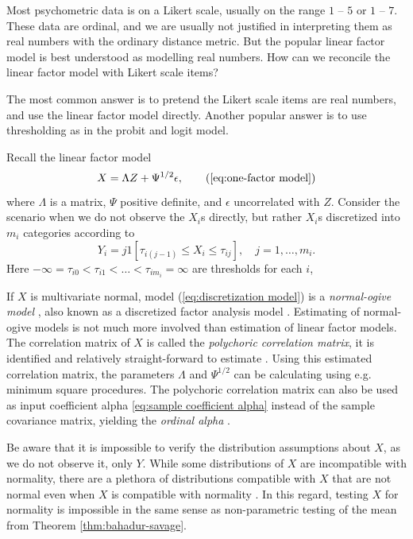 Most psychometric data is on a Likert scale, usually on the range $1$ -- $5$ or $1$ -- $7$. These data are ordinal, and we are usually not justified in interpreting them as real numbers with the ordinary distance metric. But the popular linear factor model is best understood as modelling real numbers. How can we reconcile the linear factor model with Likert scale items?

The most common answer is to pretend the Likert scale items are real numbers, and use the linear factor model directly. Another popular answer is to use thresholding as in the probit and logit model.  

Recall the linear factor model
\begin{equation}
X=\Lambda Z+\Psi^{1/2}\epsilon,      \tag{\ref{eq:one-factor model}}
\end{equation}
where $\Lambda$ is a matrix, $\Psi$ positive definite, and $\epsilon$ uncorrelated with $Z$. Consider the scenario when we do not observe the $X_{i}$s directly, but rather $X_{i}$s discretized into $m_{i}$ categories according to
\begin{equation}
Y_{i}=j1[\tau_{i(j-1)}\leq X_{i}\leq\tau_{ij}],\quad j = 1, \ldots,m_i. \label{eq:discretization model}
\end{equation}
Here $-\infty=\tau_{i0}<\tau_{i1}<\ldots<\tau_{im_{i}}=\infty$
are thresholds for each $i$, 

If $X$ is multivariate normal, model (\ref{eq:discretization model})
is a \textit{normal-ogive model} \parencite{Swaminathan2016-rg}, also known as a discretized factor analysis model \parencite{Takane1987-pq}. Estimating of normal-ogive models is not much more involved than estimation of linear factor models. The correlation matrix of $X$ is called the \textit{polychoric correlation matrix}, it is identified and relatively straight-forward to estimate \parencite{Olsson1979-ti}. Using this estimated correlation matrix, the parameters $\Lambda$ and $\Psi^{1/2}$ can be calculating using e.g. minimum square procedures. The polychoric correlation matrix can also be used as input coefficient alpha \eqref{eq:sample coefficient alpha} instead of the sample covariance matrix, yielding the \textit{ordinal alpha} \parencite{Zumbo2007-ap}. 

Be aware that it is impossible to verify the distribution assumptions about $X$, as we do not observe it, only $Y$. While some distributions of $X$ are incompatible with normality, there are a plethora of distributions compatible with $X$ that are not normal even when $X$ is compatible with normality \parencite{Foldnes2020-ma}. In this regard, testing $X$ for normality is impossible in the same sense as non-parametric testing of the mean from Theorem \ref{thm:bahadur-savage}.
